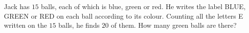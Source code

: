 Jack has $15$ balls, each of which is blue, green or red. He writes the label BLUE, GREEN or RED on each ball according to its colour. Counting all the letters E written on the $15$ balls, he finds $20$ of them. How many green balls are there?

